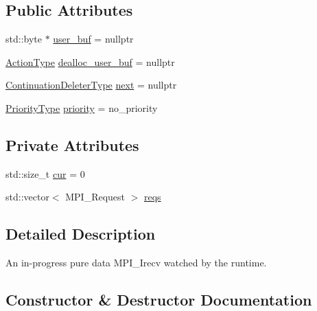 \subsection*{Public Attributes}
\begin{DoxyCompactItemize}
\item 
std\+::byte $\ast$ \hyperlink{structvt_1_1messaging_1_1_in_progress_data_i_recv_affc7774716056ef55e65ebf8e288ac0f}{user\+\_\+buf} = nullptr
\item 
\hyperlink{namespacevt_ae0a5a7b18cc99d7b732cb4d44f46b0f3}{Action\+Type} \hyperlink{structvt_1_1messaging_1_1_in_progress_data_i_recv_ad1cd80fe79577e1a22177ad1f49f8c0d}{dealloc\+\_\+user\+\_\+buf} = nullptr
\item 
\hyperlink{namespacevt_a6de3bd201e2a040be9362d9d24d1e446}{Continuation\+Deleter\+Type} \hyperlink{structvt_1_1messaging_1_1_in_progress_data_i_recv_a0f080a57da0a21402687c3a96d535036}{next} = nullptr
\item 
\hyperlink{namespacevt_a86bff9f556eb761b27fc8600d006ac04}{Priority\+Type} \hyperlink{structvt_1_1messaging_1_1_in_progress_data_i_recv_a4ba8a7812367449cfe568d87806fd4c4}{priority} = no\+\_\+priority
\end{DoxyCompactItemize}
\subsection*{Private Attributes}
\begin{DoxyCompactItemize}
\item 
std\+::size\+\_\+t \hyperlink{structvt_1_1messaging_1_1_in_progress_data_i_recv_a74c8704c86b2be19c06a0b7152aede88}{cur} = 0
\item 
std\+::vector$<$ M\+P\+I\+\_\+\+Request $>$ \hyperlink{structvt_1_1messaging_1_1_in_progress_data_i_recv_a077c3734a7c030be8e230406af350781}{reqs}
\end{DoxyCompactItemize}


\subsection{Detailed Description}
An in-\/progress pure data M\+P\+I\+\_\+\+Irecv watched by the runtime. 

\subsection{Constructor \& Destructor Documentation}
\mbox{\label{structvt_1_1messaging_1_1_in_progress_data_i_recv_ade6ceb29a94d9adcfd05a5ff0c6e4383}} 
